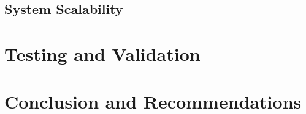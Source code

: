 
\subsection{System Scalability}
\label{subsec:scalability}

\section{Testing and Validation}
\label{sec:testing}

\section{Conclusion and Recommendations}
\label{sec:conclusion}

\newpage
